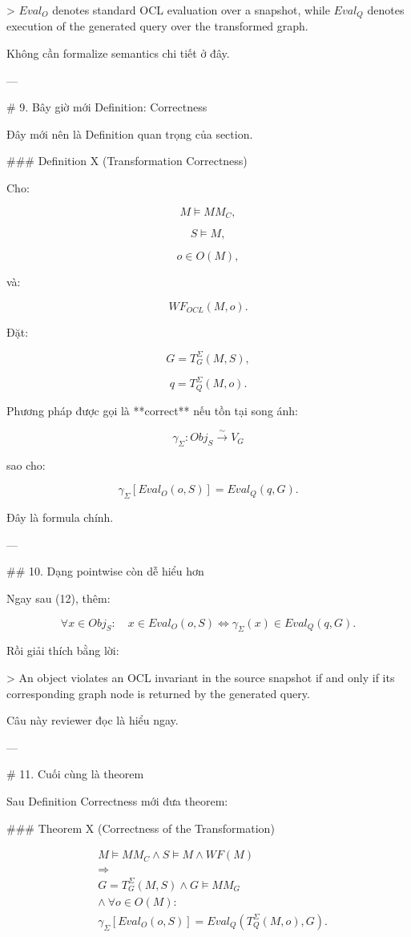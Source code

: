 > \(Eval_O\) denotes standard OCL evaluation over a snapshot, while \(Eval_Q\) denotes execution of the generated query over the transformed graph.

Không cần formalize semantics chi tiết ở đây.

---

# 9. Bây giờ mới Definition: Correctness

Đây mới nên là Definition quan trọng của section.

### Definition X (Transformation Correctness)

Cho:

$$
M\models MM_C,
$$

$$
S\models M,
$$

$$
o\in O(M),
$$

và:

$$
WF_{OCL}(M,o).
$$

Đặt:

$$
G=T_G^\Sigma(M,S),
$$

$$
q=T_Q^\Sigma(M,o).
$$

Phương pháp được gọi là **correct** nếu tồn tại song ánh:

$$
\gamma_\Sigma:
Obj_S
\overset{\sim}{\rightarrow}
V_G
$$

sao cho:

$$
\boxed{
\gamma_\Sigma
\left[
Eval_O(o,S)
\right]
=
Eval_Q(q,G).
}
\tag{12}
$$

Đây là formula chính.

---

## 10. Dạng pointwise còn dễ hiểu hơn

Ngay sau (12), thêm:

$$
\boxed{
\forall x\in Obj_S:
\quad
x\in Eval_O(o,S)
\iff
\gamma_\Sigma(x)\in Eval_Q(q,G).
}
\tag{13}
$$

Rồi giải thích bằng lời:

> An object violates an OCL invariant in the source snapshot if and only if its corresponding graph node is returned by the generated query.

Câu này reviewer đọc là hiểu ngay.

---

# 11. Cuối cùng là theorem

Sau Definition Correctness mới đưa theorem:

### Theorem X (Correctness of the Transformation)

$$
\boxed{
\begin{aligned}
&M\models MM_C
\land
S\models M
\land
WF(M)
\\
&\Longrightarrow
\\
&G=T_G^\Sigma(M,S)
\land
G\models MM_G
\\
&\land\
\forall o\in O(M):
\\
&
\gamma_\Sigma
[
Eval_O(o,S)
]
=
Eval_Q
(
T_Q^\Sigma(M,o),
G
).
\end{aligned}
}
\tag{14}
$$

